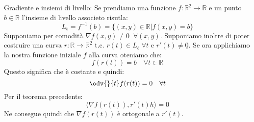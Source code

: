 Gradiente e insiemi di livello: Se prendiamo una funzione $f: \mathbb{R}^2 \to \mathbb{R}$ e un punto $b \in \mathbb{R}$ l'insieme di livello associeto risutla:
\begin{equation*}
	L_b = f^{-1}(b) = \{(x, y) \in \mathbb{R} | f(x, y) = b\}
\end{equation*}
Supponiamo per comodità $\nabla f(x, y) \neq \underline{0} \;\; \forall (x, y)$. Supponiamo inoltre di poter costruire una curva $r: \mathbb{R} \to \mathbb{R}^2$ t.c. $r(t) \in L_b \; \forall t$ e $r'(t) \neq \underline{0}$. Se ora applichiamo la nostra funzione iniziale $f$ alla curva oteniamo che:
\begin{equation*}
	f(r(t)) = b \quad \forall t \in \mathbb{R}
\end{equation*}
Questo significa che è costante e quindi:
\begin{equation*}
	\odv{}{t} f(r(t)) = 0 \quad \forall t
\end{equation*}
Per il teorema precedente:
\begin{equation*}
	\langle \nabla f(r(t)), r'(t)h \rangle = 0
\end{equation*}
Ne consegue quindi che $\nabla f(r(t))$ è ortogonale a $r'(t)$.

